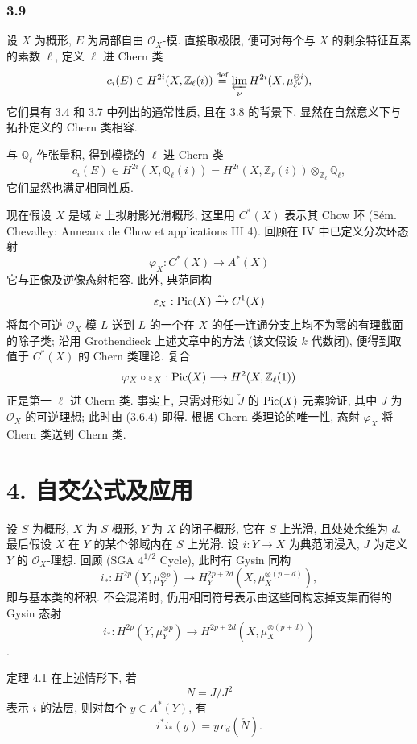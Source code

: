\subsubsection*{3.9}
设 $X$ 为概形, $E$ 为局部自由 $\mathcal O_X$-模. 直接取极限, 便可对每个与 $X$ 的剩余特征互素的素数 $\ell$, 定义 $\ell$ 进 Chern 类
\[
c_i(E)\in H^{2i}(X,\mathbb Z_\ell(i))
\stackrel{\mathrm{def}}{=}\varprojlim_\nu H^{2i}(X,\mu_{\ell^\nu}^{\otimes i}),
\]
它们具有 3.4 和 3.7 中列出的通常性质, 且在 3.8 的背景下, 显然在自然意义下与拓扑定义的 Chern 类相容.

与 $\mathbb Q_\ell$ 作张量积, 得到模挠的 $\ell$ 进 Chern 类
\[
c_i(E)\in H^{2i}(X,\mathbb Q_\ell(i))
=H^{2i}(X,\mathbb Z_\ell(i))\otimes_{\mathbb Z_\ell}\mathbb Q_\ell,
\]
它们显然也满足相同性质.

现在假设 $X$ 是域 $k$ 上拟射影光滑概形, 这里用 $C^*(X)$ 表示其 Chow 环 (Sém. Chevalley: Anneaux de Chow et applications III 4). 回顾在 IV 中已定义分次环态射
\[
\varphi_X:C^*(X)\to A^*(X)
\]
它与正像及逆像态射相容. 此外, 典范同构
\[
\varepsilon_X:\operatorname{Pic}(X)\xrightarrow{\sim} C^1(X)
\]
将每个可逆 $\mathcal O_X$-模 $L$ 送到 $L$ 的一个在 $X$ 的任一连通分支上均不为零的有理截面的除子类; 沿用 Grothendieck 上述文章中的方法 (该文假设 $k$ 代数闭), 便得到取值于 $C^*(X)$ 的 Chern 类理论. 复合
\[
\varphi_X\circ\varepsilon_X:\operatorname{Pic}(X)\longrightarrow H^2(X,\mathbb Z_\ell(1))
\]
正是第一 $\ell$ 进 Chern 类. 事实上, 只需对形如 $\check J$ 的 $\operatorname{Pic}(X)$ 元素验证, 其中 $J$ 为 $\mathcal O_X$ 的可逆理想; 此时由 (3.6.4) 即得. 根据 Chern 类理论的唯一性, 态射 $\varphi_X$ 将 Chern 类送到 Chern 类.

\section*{4. 自交公式及应用}

设 $S$ 为概形, $X$ 为 $S$-概形, $Y$ 为 $X$ 的闭子概形, 它在 $S$ 上光滑, 且处处余维为 $d$. 最后假设 $X$ 在 $Y$ 的某个邻域内在 $S$ 上光滑. 设 $i:Y\to X$ 为典范闭浸入, $J$ 为定义 $Y$ 的 $\mathcal O_X$-理想. 回顾 (SGA $4^{1/2}$ Cycle), 此时有 Gysin 同构
\[
i_*:H^{2p}(Y,\mu_Y^{\otimes p})
\to H_Y^{2p+2d}(X,\mu_X^{\otimes(p+d)}),
\]
即与基本类的杯积. 不会混淆时, 仍用相同符号表示由这些同构忘掉支集而得的 Gysin 态射
\[
i_*:H^{2p}(Y,\mu_Y^{\otimes p})
\to H^{2p+2d}(X,\mu_X^{\otimes(p+d)})
\]
.

\begin{statement}{定理 4.1}
在上述情形下, 若
\[
N=J/J^2
\]
表示 $i$ 的法层, 则对每个 $y\in A^*(Y)$, 有
\[
i^*i_*(y)=y\,c_d(\check N).
\]
\end{statement}

